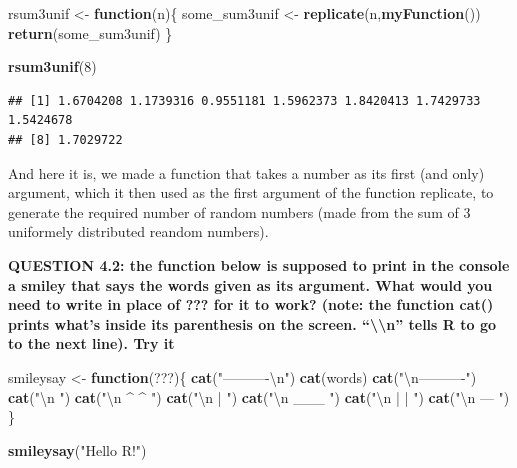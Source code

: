 \documentclass[]{book}
\newenvironment{Shaded}{\begin{snugshade}}{\end{snugshade}}
\newcommand{\CharTok}[1]{\textcolor[rgb]{0.31,0.60,0.02}{#1}}
\newcommand{\ControlFlowTok}[1]{\textcolor[rgb]{0.13,0.29,0.53}{\textbf{#1}}}
\newcommand{\DecValTok}[1]{\textcolor[rgb]{0.00,0.00,0.81}{#1}}
\newcommand{\KeywordTok}[1]{\textcolor[rgb]{0.13,0.29,0.53}{\textbf{#1}}}
\newcommand{\NormalTok}[1]{#1}
\newcommand{\StringTok}[1]{\textcolor[rgb]{0.31,0.60,0.02}{#1}}
\begin{document}
\begin{Shaded}
\begin{Highlighting}[]
\NormalTok{rsum3unif <-}\StringTok{ }\ControlFlowTok{function}\NormalTok{(n)\{}
\NormalTok{  some_sum3unif <-}\StringTok{ }\KeywordTok{replicate}\NormalTok{(n,}\KeywordTok{myFunction}\NormalTok{())}
  \KeywordTok{return}\NormalTok{(some_sum3unif)}
\NormalTok{\}}

\KeywordTok{rsum3unif}\NormalTok{(}\DecValTok{8}\NormalTok{)}
\end{Highlighting}
\end{Shaded}

\begin{verbatim}
## [1] 1.6704208 1.1739316 0.9551181 1.5962373 1.8420413 1.7429733 1.5424678
## [8] 1.7029722
\end{verbatim}

And here it is, we made a function that takes a number as its first (and only) argument, which it then used as the first argument of the function replicate, to generate the required number of random numbers (made from the sum of 3 uniformely distributed reandom numbers).

\textbf{QUESTION 4.2: the function below is supposed to print in the console a smiley that says the words given as its argument. What would you need to write in place of ??? for it to work? (note: the function cat() prints what's inside its parenthesis on the screen. ``\textbackslash{}\textbackslash{}n'' tells R to go to the next line). Try it}

\begin{Shaded}
\begin{Highlighting}[]
\NormalTok{smileysay <-}\StringTok{ }\ControlFlowTok{function}\NormalTok{(???)\{}
  \KeywordTok{cat}\NormalTok{(}\StringTok{"----------}\CharTok{\textbackslash{}n}\StringTok{"}\NormalTok{)}
  \KeywordTok{cat}\NormalTok{(words)}
  \KeywordTok{cat}\NormalTok{(}\StringTok{"}\CharTok{\textbackslash{}n}\StringTok{----------"}\NormalTok{)}
  \KeywordTok{cat}\NormalTok{(}\StringTok{"}\CharTok{\textbackslash{}n}\StringTok{       "}\NormalTok{)}
  \KeywordTok{cat}\NormalTok{(}\StringTok{"}\CharTok{\textbackslash{}n}\StringTok{ ^   ^ "}\NormalTok{)}
  \KeywordTok{cat}\NormalTok{(}\StringTok{"}\CharTok{\textbackslash{}n}\StringTok{   |   "}\NormalTok{)}
  \KeywordTok{cat}\NormalTok{(}\StringTok{"}\CharTok{\textbackslash{}n}\StringTok{  ___  "}\NormalTok{)}
  \KeywordTok{cat}\NormalTok{(}\StringTok{"}\CharTok{\textbackslash{}n}\StringTok{ |   | "}\NormalTok{)}
  \KeywordTok{cat}\NormalTok{(}\StringTok{"}\CharTok{\textbackslash{}n}\StringTok{  ---  "}\NormalTok{)}
\NormalTok{\}}

\KeywordTok{smileysay}\NormalTok{(}\StringTok{"Hello R!"}\NormalTok{)}
\end{Highlighting}
\end{Shaded}
\end{document}
